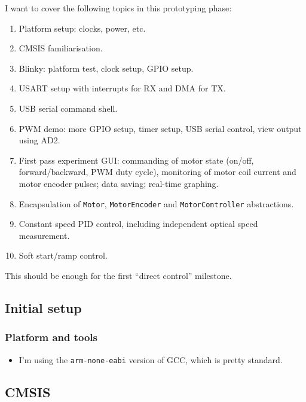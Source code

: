 \documentclass[a4paper,11pt,article]{memoir}
\begin{document}
I want to cover the following topics in this prototyping phase:
\begin{enumerate}
  \item{Platform setup: clocks, power, etc.}
  \item{CMSIS familiarisation.}
  \item{Blinky: platform test, clock setup, GPIO setup.}
  \item{USART setup with interrupts for RX and DMA for TX.}
  \item{USB serial command shell.}
  \item{PWM demo: more GPIO setup, timer setup, USB serial control,
    view output using AD2.}
  \item{First pass experiment GUI: commanding of motor state (on/off,
    forward/backward, PWM duty cycle), monitoring of motor coil
    current and motor encoder pulses; data saving; real-time
    graphing.}
  \item{Encapsulation of \texttt{Motor}, \texttt{MotorEncoder} and
    \texttt{MotorController} abstractions.}
  \item{Constant speed PID control, including independent optical
    speed measurement.}
  \item{Soft start/ramp control.}
\end{enumerate}

This should be enough for the first ``direct control'' milestone.


\subsection{Initial setup}

\subsubsection{Platform and tools}

\begin{itemize}
  \item{I'm using the \texttt{arm-none-eabi} version of GCC, which is
    pretty standard.}
\end{itemize}

\subsection{CMSIS}
\end{document}
